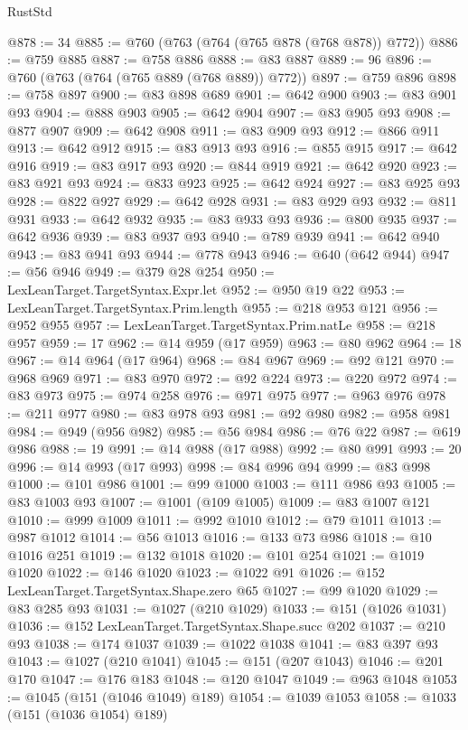 \begin{lexlean}{RustStd}
\begin{coremodule}
@878 := 34
@885 := @760 (@763 (@764 (@765 @878 (@768 @878)) @772))
@886 := @759 @885
@887 := @758 @886
@888 := @83 @887
@889 := 96
@896 := @760 (@763 (@764 (@765 @889 (@768 @889)) @772))
@897 := @759 @896
@898 := @758 @897
@900 := @83 @898 @689
@901 := @642 @900
@903 := @83 @901 @93
@904 := @888 @903
@905 := @642 @904
@907 := @83 @905 @93
@908 := @877 @907
@909 := @642 @908
@911 := @83 @909 @93
@912 := @866 @911
@913 := @642 @912
@915 := @83 @913 @93
@916 := @855 @915
@917 := @642 @916
@919 := @83 @917 @93
@920 := @844 @919
@921 := @642 @920
@923 := @83 @921 @93
@924 := @833 @923
@925 := @642 @924
@927 := @83 @925 @93
@928 := @822 @927
@929 := @642 @928
@931 := @83 @929 @93
@932 := @811 @931
@933 := @642 @932
@935 := @83 @933 @93
@936 := @800 @935
@937 := @642 @936
@939 := @83 @937 @93
@940 := @789 @939
@941 := @642 @940
@943 := @83 @941 @93
@944 := @778 @943
@946 := @640 (@642 @944)
@947 := @56 @946
@949 := @379 @28 @254
@950 := LexLeanTarget.TargetSyntax.Expr.let
@952 := @950 @19 @22
@953 := LexLeanTarget.TargetSyntax.Prim.length
@955 := @218 @953 @121
@956 := @952 @955
@957 := LexLeanTarget.TargetSyntax.Prim.natLe
@958 := @218 @957
@959 := 17
@962 := @14 @959 (@17 @959)
@963 := @80 @962
@964 := 18
@967 := @14 @964 (@17 @964)
@968 := @84 @967
@969 := @92 @121
@970 := @968 @969
@971 := @83 @970
@972 := @92 @224
@973 := @220 @972
@974 := @83 @973
@975 := @974 @258
@976 := @971 @975
@977 := @963 @976
@978 := @211 @977
@980 := @83 @978 @93
@981 := @92 @980
@982 := @958 @981
@984 := @949 (@956 @982)
@985 := @56 @984
@986 := @76 @22
@987 := @619 @986
@988 := 19
@991 := @14 @988 (@17 @988)
@992 := @80 @991
@993 := 20
@996 := @14 @993 (@17 @993)
@998 := @84 @996 @94
@999 := @83 @998
@1000 := @101 @986
@1001 := @99 @1000
@1003 := @111 @986 @93
@1005 := @83 @1003 @93
@1007 := @1001 (@109 @1005)
@1009 := @83 @1007 @121
@1010 := @999 @1009
@1011 := @992 @1010
@1012 := @79 @1011
@1013 := @987 @1012
@1014 := @56 @1013
@1016 := @133 @73 @986
@1018 := @10 @1016 @251
@1019 := @132 @1018
@1020 := @101 @254
@1021 := @1019 @1020
@1022 := @146 @1020
@1023 := @1022 @91
@1026 := @152 LexLeanTarget.TargetSyntax.Shape.zero @65
@1027 := @99 @1020
@1029 := @83 @285 @93
@1031 := @1027 (@210 @1029)
@1033 := @151 (@1026 @1031)
@1036 := @152 LexLeanTarget.TargetSyntax.Shape.succ @202
@1037 := @210 @93
@1038 := @174 @1037
@1039 := @1022 @1038
@1041 := @83 @397 @93
@1043 := @1027 (@210 @1041)
@1045 := @151 (@207 @1043)
@1046 := @201 @170
@1047 := @176 @183
@1048 := @120 @1047
@1049 := @963 @1048
@1053 := @1045 (@151 (@1046 @1049) @189)
@1054 := @1039 @1053
@1058 := @1033 (@151 (@1036 @1054) @189)

\end{coremodule}
\end{lexlean}
